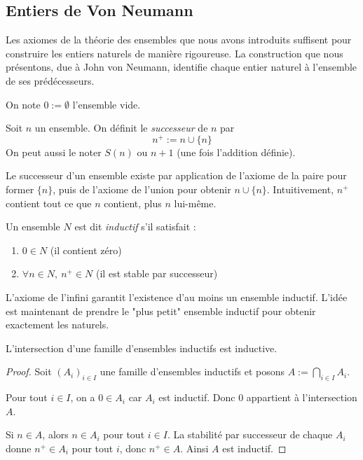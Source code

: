 \subsection{Entiers de Von Neumann}

Les axiomes de la théorie des ensembles que nous avons introduits suffisent pour construire les entiers naturels de manière rigoureuse. La construction que nous présentons, due à John von Neumann, identifie chaque entier naturel à l'ensemble de ses prédécesseurs.

\begin{definition}
    On note $0 := \emptyset$ l'ensemble vide.
\end{definition}

\begin{definition}
    Soit $n$ un ensemble. On définit le \emph{successeur} de $n$ par
    \[
    n^+:= n\cup\{n\}
    \]
    On peut aussi le noter $S(n)$ ou $n+1$ (une fois l'addition définie).
\end{definition}

\begin{remarque}
    Le successeur d'un ensemble existe par application de l'axiome de la paire pour former $\{n\}$, puis de l'axiome de l'union pour obtenir $n \cup \{n\}$. Intuitivement, $n^+$ contient tout ce que $n$ contient, plus $n$ lui-même.
\end{remarque}

\begin{definition}
    Un ensemble $N$ est dit \emph{inductif} s'il satisfait :
    \begin{enumerate}
        \item $0 \in N$ (il contient zéro)
        \item $\forall n \in N, \: n^+ \in N$ (il est stable par successeur)
    \end{enumerate}
\end{definition}

\begin{remarque}
    L'axiome de l'infini garantit l'existence d'au moins un ensemble inductif. L'idée est maintenant de prendre le "plus petit" ensemble inductif pour obtenir exactement les naturels.
\end{remarque}

\begin{lemme}\label{ens : naturels : inter_inductif}
    L'intersection d'une famille d'ensembles inductifs est inductive.
\end{lemme}

\begin{proof}
    Soit $(A_i)_{i\in I}$ une famille d'ensembles inductifs et posons $A := \bigcap_{i\in I}A_i$. 
    
    Pour tout $i \in I$, on a $0 \in A_i$ car $A_i$ est inductif. Donc $0$ appartient à l'intersection $A$.
    
    Si $n \in A$, alors $n \in A_i$ pour tout $i \in I$. La stabilité par successeur de chaque $A_i$ donne $n^+ \in A_i$ pour tout $i$, donc $n^+ \in A$.
    Ainsi $A$ est inductif.
\end{proof}

